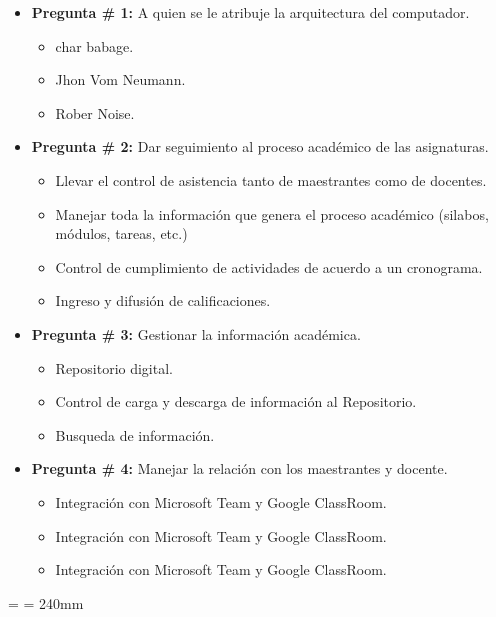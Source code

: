 \documentclass[a4paper,12pt,spanish]{article}
\begin{document}
\begin{itemize}
\item \textbf{Pregunta \# 1:} A quien se le atribuje la arquitectura del computador.
  \begin{itemize}
  \item  char babage.
  \item Jhon Vom Neumann.
  \item Rober Noise.
  \end{itemize}
\item \textbf{Pregunta \# 2:} Dar seguimiento al proceso académico de las asignaturas.
  \begin{itemize}
  \item Llevar el control de asistencia tanto de maestrantes como de docentes.
  \item Manejar toda la información que genera el proceso académico (silabos, módulos, tareas, etc.)
  \item Control de cumplimiento de actividades de acuerdo a un cronograma.
  \item Ingreso y difusión de calificaciones.
  \end{itemize}
\item \textbf{Pregunta \# 3:} Gestionar la información académica.
  \begin{itemize}
  \item Repositorio digital.
  \item Control de carga y descarga de información al Repositorio.
  \item Busqueda de información. 
  \end{itemize}
\item \textbf{Pregunta \# 4:} Manejar la relación con los maestrantes y docente.
  \begin{itemize}
  \item Integración con Microsoft Team y Google ClassRoom.
  \item Integración con Microsoft Team y Google ClassRoom.
  \item Integración con Microsoft Team y Google ClassRoom.
  \end{itemize}
\end{itemize}


\restoregeometry
\newpage

\pdfpagewidth=297mm   %
\pdfpageheight=210mm %
\textwidth=250mm
\textheight=190mm
\headwidth=\textwidth
\linewidth= 240mm
\end{document}
